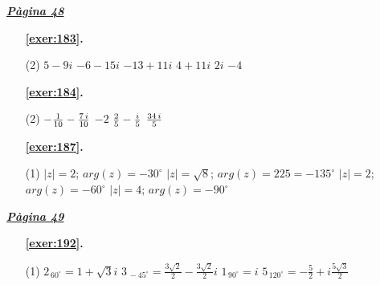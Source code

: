  \vspace{1cm} 
 

\vspace{0.3cm}


\hyperlink{page.48}{\textbf{\em Pàgina 48}}
\begin{enumerate}



 \item[\fontfamily{phv}\selectfont\color{blue}\textbf{\ref{exer:183}. }] \label{ans:183}
 \begin{tasks}[column-sep=1em, item-indent=1.3333em](2)
	 \task  $5 -9i$
	 \task $-6-15i$
	 \task $-13+11i$
	 \task $4 + 11i$
	 \task $2i$
	 \task $-4$
\end{tasks}
 \end{enumerate}
\begin{enumerate}



 \item[\fontfamily{phv}\selectfont\color{blue}\textbf{\ref{exer:184}. }] \label{ans:184}
 \begin{tasks}[column-sep=1em, item-indent=1.3333em](2)
	 \task  $-{{1}\over {10}}-{{7\,i}\over {10}}$
	 \task $-2$
	 \task ${{2}\over {5}}-{{i}\over {5}}$
	 \task ${{34\,i}\over {5}}$
\end{tasks}



 \item[\fontfamily{phv}\selectfont\color{blue}\textbf{\ref{exer:187}. }] \label{ans:187}
 \begin{tasks}[column-sep=1em, item-indent=1.3333em](1)
	 \task  $|z|=2$; $arg(z)=-30^\circ $
	 \task* $|z|=\sqrt {8}$; $arg(z)=225 = - 135^\circ $
	 \task $|z|=2$; $arg(z)=-60^\circ $
	 \task $|z|=4$; $arg(z)=-90^\circ $
\end{tasks}
 \end{enumerate}
\vspace{0.3cm}


\hyperlink{page.49}{\textbf{\em Pàgina 49}}
\begin{enumerate}



 \item[\fontfamily{phv}\selectfont\color{blue}\textbf{\ref{exer:192}. }] \label{ans:192}
 \begin{tasks}[column-sep=1em, item-indent=1.3333em](1)
	 \task*  $2_{\,60^\circ }= 1 + \sqrt {3} i$
	 \task* $3_{\,-45^\circ }= \frac {3\sqrt {2}}{2} - \frac {3\sqrt {2}}{2} i$
	 \task $1_{\,90^\circ }= i $
	 \task* $5_{\,120^\circ }= -\frac {5}{2} + i \frac {5\sqrt {3}}{2}$
\end{tasks}
 \end{enumerate}
\vspace{0.3cm}

